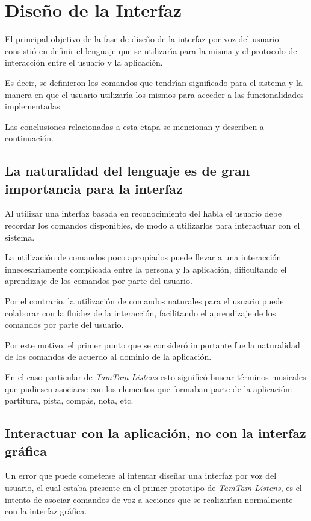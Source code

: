 \section{Dise\~no de la Interfaz}
\label{sec:disenho-interfaz}

El principal objetivo de la fase de dise\~no de la interfaz por voz del usuario consisti\'o
en definir el lenguaje que se utilizar{\'\i}a para la misma y el protocolo de interacci\'on entre
el usuario y la aplicaci\'on.

Es decir, se definieron los comandos que tendr{\'\i}an significado para el sistema y la manera
en que el usuario utilizar{\'\i}a los mismos para acceder a las funcionalidades implementadas.

Las conclusiones relacionadas a esta etapa se mencionan y describen a continuaci\'on.

\subsection{La naturalidad del lenguaje es de gran importancia para la interfaz}
Al utilizar una interfaz basada en reconocimiento del habla el usuario debe recordar los
comandos disponibles, de modo a utilizarlos para interactuar con el sistema.

La utilizaci\'on de comandos poco apropiados puede llevar a una interacci\'on innecesariamente
complicada entre la persona y la aplicaci\'on, dificultando el aprendizaje
de los comandos por parte del usuario.

Por el contrario, la utilizaci\'on de comandos naturales para el usuario puede colaborar
con la fluidez de la interacci\'on, facilitando el aprendizaje de los comandos por parte del usuario. 

Por este motivo, el primer punto que se consider\'o importante fue la naturalidad de los comandos
de acuerdo al dominio de la aplicaci\'on.

En el caso particular de \emph{TamTam Listens} esto signific\'o buscar t\'erminos musicales
que pudiesen asociarse con los elementos que formaban parte de la aplicaci\'on: partitura,
pista, comp\'as, nota, etc.

\subsection{Interactuar con la aplicaci\'on, no con la interfaz gr\'afica}
Un error que puede cometerse al intentar dise\~nar una interfaz por voz del usuario,
el cual estaba presente en el primer prototipo de \emph{TamTam Listens}, es el intento
de asociar comandos de voz a acciones que se realizar{\'\i}an normalmente con la interfaz
gr\'afica.

